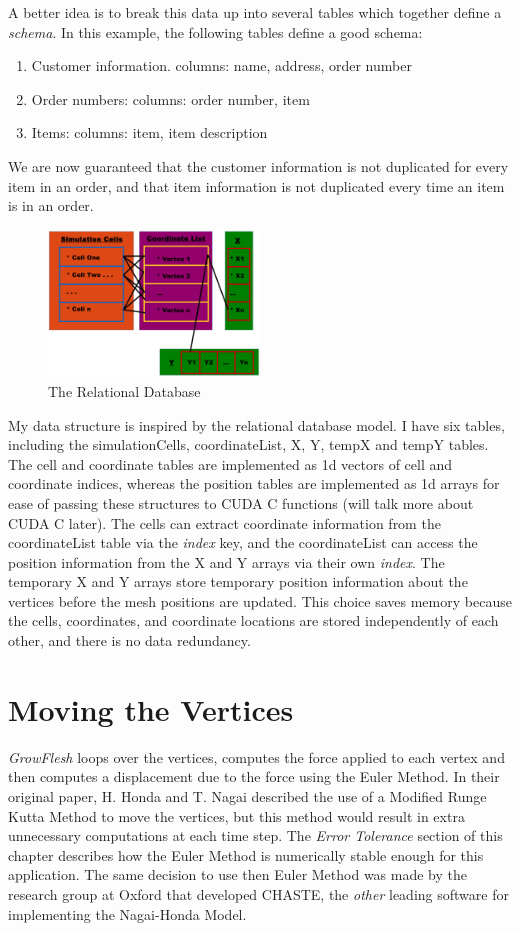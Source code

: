 A better idea is to break this data up into several tables which together define a \emph{schema}. In this example, the following tables define a good schema:
\begin{enumerate}
\item Customer information. columns: name, address, order number
\item Order numbers: columns: order number, item
\item Items: columns: item, item description
\end{enumerate}

We are now guaranteed that the customer information is not duplicated for every item in an order, and that item information is not duplicated every time an item is in an order.

\begin{figure}[h]
\centering
\includegraphics[width=0.5\textwidth]{../diagrams/ds.png}
\caption{The Relational Database}
\end{figure}

My data structure is inspired by the relational database model. I have six tables, including the simulationCells, coordinateList, X, Y, tempX and tempY tables. The cell and coordinate tables are implemented as 1d vectors of cell and coordinate indices, whereas the position tables are implemented as 1d arrays for ease of passing these structures to CUDA C functions (will talk more about CUDA C later). The cells can extract coordinate information from the coordinateList table via the \emph{index} key, and the coordinateList can access the position information from the X and Y arrays via their own \emph{index}. The temporary X and Y arrays store temporary position information about the vertices before the mesh positions are updated. This choice saves memory because the cells, coordinates, and coordinate locations are stored independently of each other, and there is no data redundancy. 

\section{Moving the Vertices}
\emph{GrowFlesh} loops over the vertices, computes the force applied to each vertex and then computes a displacement due to the force using the Euler Method. In their original paper, H. Honda and T. Nagai described the use of a Modified Runge Kutta Method to move the vertices, but this method would result in extra unnecessary computations at each time step. The \emph{Error Tolerance} section of this chapter describes how the Euler Method is numerically stable enough for this application. The same decision to use then Euler Method was made by the research group at Oxford that developed CHASTE, the \emph{other} leading software for implementing the Nagai-Honda Model. 

